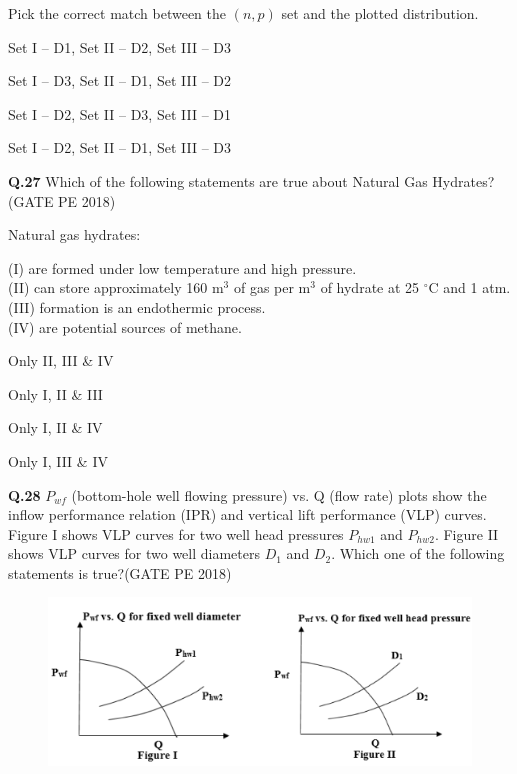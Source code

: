 \documentclass[journal,12pt,onecolumn]{IEEEtran}
\theoremstyle{remark}
\begin{document}
Pick the correct match between the $(n, p)$ set and the plotted distribution.

\begin{enumerate}
\begin{multicols}{2}
\item Set I – D1, Set II – D2, Set III – D3 \item Set I – D3, Set II – D1, Set III – D2 
\item Set I – D2, Set II – D3, Set III – D1 \item Set I – D2, Set II – D1, Set III – D3
\end{multicols}
\end{enumerate}

\pagebreak

\noindent\textbf{Q.27} Which of the following statements are true about Natural Gas Hydrates?
\hfill (GATE PE 2018)

\vspace{0.2cm}
\noindent
Natural gas hydrates:


\noindent
(I) are formed under low temperature and high pressure.\\
(II) can store approximately 160 m$^3$ of gas per m$^3$ of hydrate at 25 $^\circ$C and 1 atm.\\
(III) formation is an endothermic process.\\
(IV) are potential sources of methane.


\begin{enumerate} 
\begin{multicols}{2}

\item Only II, III \& IV \item Only I, II \& III
\item Only I, II \& IV  \item Only I, III \& IV 
\end{multicols}
\end{enumerate}

\noindent
\textbf{Q.28} $P_{wf}$ (bottom-hole well flowing pressure) vs. Q (flow rate) plots show the inflow
performance relation (IPR) and vertical lift performance (VLP) curves. Figure I shows
VLP curves for two well head pressures $P_{hw1}$ and $P_{hw2}$. Figure II shows VLP curves for two
well diameters $D_1$ and $D_2$. Which one of the following statements is true?\hfill(GATE PE 2018)

\begin{figure}[h!]
  \centering
  \includegraphics[width=0.8\columnwidth]{pic9.png} 
\end{figure}
\end{document}
